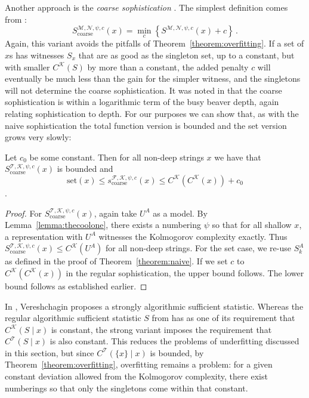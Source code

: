 \documentclass{style/llncs}
\newcommand{\M}{\mathscr M}
\newcommand{\T}{\mathscr T}
\newcommand{\F}{\mathscr F}
\newcommand{\K}{\mathscr K}
\newcommand{\Nm}{\mathscr N}
\newcommand{\s}{S}
\newcommand{\p}{\,\text{.}}
\begin{document}
Another approach is the \emph{coarse sophistication} \cite{antunes2009sophistication}. The simplest definition comes from \cite{mota2013sophistication}:
\[
\s^{\M,\Nm,\psi, c}_\text{coarse}(x) = \min_c\left\{\s^{\M,\Nm,\psi,c}(x) + c \right\} \p
\]
Again, this variant avoids the pitfalls of Theorem~\ref{theorem:overfitting}. If a set of $x$s has witnesses $S_x$ that are as good as the singleton set, up to a constant, but with smaller $C^\K(S)$ by more than a constant, the added penalty $c$ will eventually be much less than the gain for the simpler witness, and the singletons will not determine the coarse sophistication. It was noted in \cite{antunes2009sophistication} that the coarse sophistication is within a logarithmic term of the busy beaver depth, again relating sophistication to depth. For our purposes we can show that, as with the naive sophistication the total function version is bounded and the set version grows very slowly:
\begin{theorem}
Let $c_0$ be some constant. Then for all non-deep strings $x$ we have that $\s_\text{coarse}^{\T,\K,\psi,c}(x)$ is bounded and
\[
\text{set}(x) \leq s_\text{coarse}^{\F,\K,\psi,c}(x) \leq C^\K(C^\K(x)) + c_0
\].\label{theorem:coarse}
\end{theorem}
\begin{proof}
For $\s_\text{coarse}^{\T,\K,\psi,c}(x)$, again take $U^A$ as a model. By Lemma~\ref{lemma:thecoolone}, there exists a numbering $\psi$ so that for all shallow $x$, a representation with $U^A$ witnesses the Kolmogorov complexity exactly. Thus $\s_\text{coarse}^{\T,\K,\psi,c}(x) \leq C^\K(U^A)$ for all non-deep strings.
For the set case, we re-use $S_k^A$ as defined in the proof of Theorem~\ref{theorem:naive}. If we set $c$ to $C^\K(C^\K(x))$ in the regular sophistication, the upper bound follows. The lower bound follows as established earlier.
\end{proof}
In \cite{vereshchagin2013algorithmic}, Vereshchagin proposes a strongly algorithmic sufficient statistic. Whereas the regular algorithmic sufficient statistic $S$ from \cite{gacs2001algorithmic} has as one of its requirement that $C^\K(S\mid x)$ is constant, the strong variant imposes the requirement that $C^\T(S\mid x)$ is also constant. This reduces the problems of underfitting discussed in this section, but since $C^\T(\{x\}\mid x)$ is bounded, by Theorem~\ref{theorem:overfitting}, overfitting remains a problem: for a given constant deviation allowed from the Kolmogorov complexity, there exist numberings so that only the singletons come within that constant.
\end{document}
